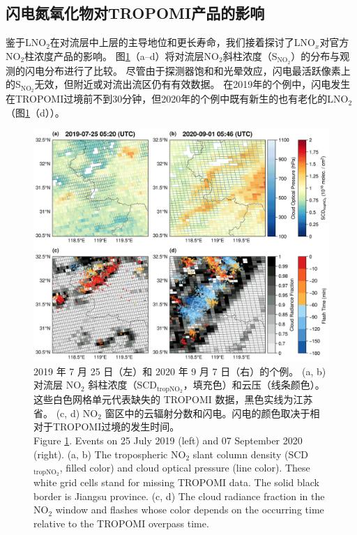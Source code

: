 \subsection{闪电氮氧化物对TROPOMI产品的影响}  \label{subsect:lnox_affects_tropomi}

鉴于LNO$_2$在对流层中上层的主导地位和更长寿命，我们接着探讨了LNO$_x$对官方NO$_2$柱浓度产品的影响。
图\ref{fig:flash_scd}（a--d）将对流层NO$_2$斜柱浓度（S$_{\textrm{NO$_2$}}$）的分布与观测的闪电分布进行了比较。
尽管由于探测器饱和和光晕效应，闪电最活跃像素上的S$_{\textrm{NO$_2$}}$无效，但附近或对流出流区仍有有效数据。
在2019年的个例中，闪电发生在TROPOMI过境前不到30分钟，但2020年的个例中既有新生的也有老化的LNO$_2$（图\ref{fig:flash_scd}（d））。

\begin{figure}[!htbp]
    \centering
    \includegraphics[width=12cm]{./figures/flash_scd.png}
    \caption{
    2019 年 7 月 25 日（左）和 2020 年 9 月 7 日（右）的个例。
    (a, b) 对流层 NO$_2$ 斜柱浓度（SCD$_\textrm{tropNO$_2$}$，填充色）和云压（线条颜色）。
    这些白色网格单元代表缺失的 TROPOMI 数据，黑色实线为江苏省。
     (c, d) NO$_2$ 窗区中的云辐射分数和闪电。闪电的颜色取决于相对于TROPOMI过境的发生时间。\\
    Figure \ref{fig:flash_scd}. Events on 25 July 2019 (left) and 07 September 2020 (right).
    (a, b) The tropospheric NO$_2$ slant column density (SCD$_\textrm{tropNO$_2$}$, filled color) and cloud optical pressure (line color).
    These white grid cells stand for missing TROPOMI data.
    The solid black border is Jiangsu province.
    (c, d) The cloud radiance fraction in the NO$_2$ window and flashes whose color depends on the occurring time relative to the TROPOMI overpass time.
    }
    \label{fig:flash_scd}
\end{figure}

